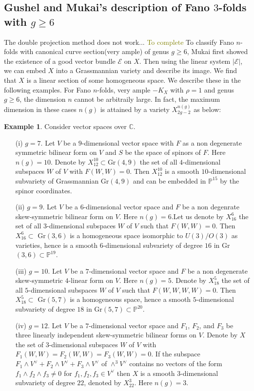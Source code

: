\documentclass[11pt]{amsart}
\theoremstyle{plain}
\theoremstyle{definition}
\newtheorem{example}[theorem]{Example}
\theoremstyle{expl}
\begin{document}
\subsection{Gushel and Mukai's description of Fano $3$-folds with $g\geq 6$}
The double projection method does not work...  \textcolor{olive}{To complete}
To classify Fano $n$-folds with canonical curve section(very ample) of genus $g \geq 6$, Mukai first showed the existence of a good vector bundle $\mathcal{E}$ on $X$. Then using the linear system $|\mathcal{E}|$, we can embed $X$ into a Grassmannian variety and describe its image. We find that $X$ is a linear section of some homogeneous space. We describe these in the following examples.
For Fano $n$-folds, very ample $-K_X$ with $\rho=1$ and genus $g\geq 6$, the dimension $n$ cannot be arbitraily large. In fact, the maximum dimension in these cases $n(g)$ is attained by a variety $X_{2g-2}^{n(g)}$ as below:
\begin{example}
Consider vector spaces over $\mathbb{C}$.
        \begin{enumerate}
            \item[(i)] $g=7$. Let $V$ be a $9$-dimensional vector space with $F$ as a non degenerate symmetric bilinear form on $V$ and $S$ be the space of spinors of $F$. Here $n(g)=10$. Denote by $X_{12}^{10} \subset $Gr$(4,9)$ the set of all $4$-dimensional subspaces $W$ of $V$ with $F(W,W)=0$. Then $X_{12}^{10}$ is a smooth $10$-dimensional subvariety of Grassmannian Gr$(4,9)$ and can be embedded in $\mathbb{P}^{15}$ by the spinor coordinates. 
            \item[(ii)] $g=9$. Let $V$ be a $6$-dimensional vector space and $F$ be a non degenrate skew-symmetric bilinear form on $V$. Here $n(g)=6$.Let us denote by $X_{16}^6$ the set of all $3$-dimensional subspaces $W$ of $V$ such that $F(W,W)=0$. Then $X_{16}^6 \subset $ Gr$(3,6)$ is a homogeneous space isomorphic to $U(3)/O(3)$ as varieties, hence is a smooth $6$-dimensional subvariety of degree $16$ in Gr$(3,6)\subset  \mathbb{P}^{19}$.
            \item[(iii)] $g=10$. Let $V$ be a $7$-dimensional vector space and $F$ be a non degenerate skew-symmetric $4$-linear form on $V$. Here $n(g)=5$. Denote by $X_{18}^5$ the set of all $5$-dimensional subspaces $W$ of $V$ such that $F(W,W,W,W)=0$. Then $X_{18}^5 \subset $ Gr$(5,7)$ is a homogeneous space, hence a smooth $5$-dimensional subvariety of degree $18$ in Gr$(5,7) \subset \mathbb{P}^{20}$. 
            
            \item[(iv)] $g=12$. Let $V$ be a $7$-dimensional vector space and $F_1$, $F_2$, and $F_3$ be three linearly independent skew-symmetric bilinear forms on $V$. Denote by $X$ the set of $3$-dimensional subspaces $W$ of $V$ with $F_1(W,W)=F_2(W,W)=F_3(W,W)=0$. If the subspace $F_1 \wedge V^{\vee} + F_2 \wedge V^{\vee} + F_3 \wedge V^{\vee}$ of $\wedge^3 V^{\vee}$ contains no vectors of the form $f_1 \wedge f_2 \wedge f_3 \neq 0$ for $f_1, f_2, f_3 \in V^{\vee}$ then $X$ is a smooth $3$-dimensional subvariety of degree $22$, denoted by $X_{22}^3$. Here $n(g)= 3$.
        \end{enumerate}
\end{example}
\end{document}
